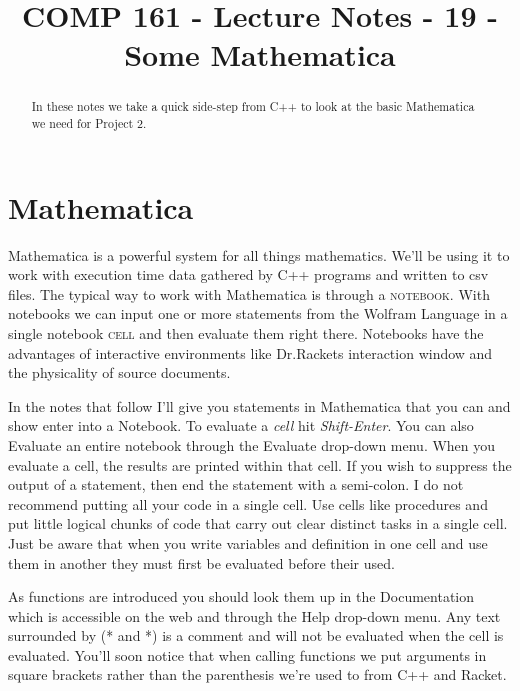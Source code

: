 \documentclass[]{tufte-handout}
\title{COMP 161 - Lecture Notes - 19 - Some Mathematica}
\date{}
\begin{document}
 
\maketitle

\begin{abstract}
In these notes we take a quick side-step from C++ to look at the basic Mathematica we need for Project 2.
\end{abstract}

\section{Mathematica}

Mathematica is a powerful system for all things mathematics. We'll be using it to work with execution time data gathered by C++ programs and written to csv files. The typical way to work with Mathematica is through a \textsc{notebook}. With notebooks we can input one or more statements from the Wolfram Language in a single notebook \textsc{cell} and then evaluate them right there. Notebooks have the advantages of interactive environments like Dr.Rackets interaction window and the physicality of source documents.  

In the notes that follow I'll give you statements in Mathematica that you can and show enter into a Notebook. To evaluate a \textit{cell} hit \textit{Shift-Enter}. You can also Evaluate an entire notebook through the Evaluate drop-down menu. When you evaluate a cell, the results are printed within that cell. If you wish to suppress the output of a statement, then end the statement with a semi-colon. I do not recommend putting all your code in a single cell. Use cells like procedures and put little logical chunks of code that carry out clear distinct tasks in a single cell. Just be aware  that when you write variables and definition in one cell and use them in another they must first be evaluated before their used. 

As functions are introduced you should look them up in the Documentation which is accessible on the web and through the Help drop-down menu. Any text surrounded by (* and *) is a comment and will not be evaluated when the cell is evaluated. You'll soon notice that when calling functions we put arguments in square brackets rather than the parenthesis we're used to from C++ and Racket.
\end{document}
